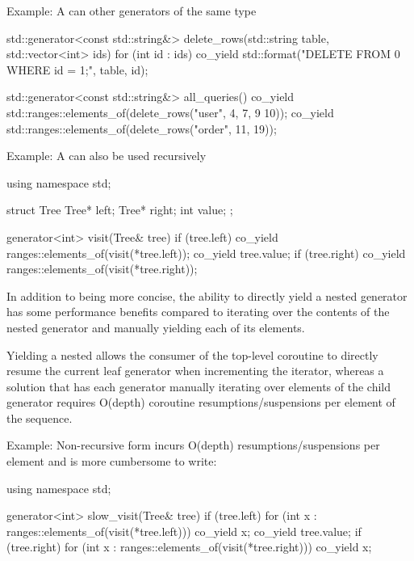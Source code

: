 \documentclass{wg21}
\begin{document}
Example: A  can  other generators of the same type
\begin{colorblock}
    std::generator<const std::string&> delete_rows(std::string table, std::vector<int> ids) {
        for (int id : ids) {
            co_yield std::format("DELETE FROM {0} WHERE id = {1};", table, id);
        }
    }

    std::generator<const std::string&> all_queries() {
        co_yield std::ranges::elements_of(delete_rows("user", {4, 7, 9 10}));
        co_yield std::ranges::elements_of(delete_rows("order", {11, 19}));
    }
\end{colorblock}

Example: A  can also be used recursively
\begin{colorblock}
    using namespace std;

    struct Tree {
        Tree* left;
        Tree* right;
        int value;
    };

    generator<int> visit(Tree& tree) {
        if (tree.left) co_yield ranges::elements_of(visit(*tree.left));
        co_yield tree.value;
        if (tree.right) co_yield ranges::elements_of(visit(*tree.right));
    }
\end{colorblock}

In addition to being more concise, the ability to directly yield a nested generator has some
performance benefits compared to iterating over the contents of the nested generator and
manually yielding each of its elements.

Yielding a nested  allows the consumer of the top-level coroutine to
directly resume the current leaf generator when incrementing the iterator, whereas a solution that has each generator manually iterating over elements of the child generator
requires O(depth) coroutine resumptions/suspensions per element of the sequence.

Example: Non-recursive form incurs O(depth) resumptions/suspensions per element
and is more cumbersome to write:
\begin{colorblock}
    using namespace std;

    generator<int> slow_visit(Tree& tree) {
        if (tree.left) {
            for (int x : ranges::elements_of(visit(*tree.left)))
                co_yield x;
        }
        co_yield tree.value;
        if (tree.right) {
            for (int x : ranges::elements_of(visit(*tree.right)))
                co_yield x;
        }
    }
\end{colorblock}
\end{document}
